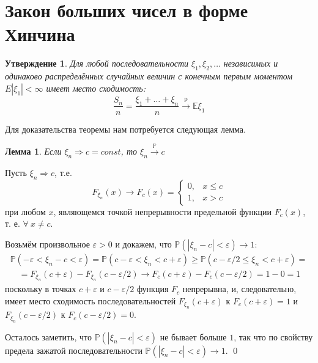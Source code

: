 \documentclass[oneside,final,14pt]{extreport}
\renewenvironment{proof}{{\bfseries Доказательство.}}{\qed}
\theoremstyle{plain}
\newtheorem*{thm*}{Утверждение}
\newtheorem*{lem}{Лемма}
\theoremstyle{definition}
\theoremstyle{named}
\begin{document}
\section{Закон больших чисел в форме Хинчина}
\begin{thm*}
    Для любой последовательности $\xi_{1}, \xi_{2}, \ldots$ независимых и одинаково распределённых случайных величин с конечным первым моментом $E\left|\xi_{1}\right|<\infty$ имеет место сходимость:
    \begin{equation*}
        \frac{S_{n}}{n} = \frac{\xi_{1}+\ldots+\xi_{n}}{n} \xrightarrow[]{\text{p}} \mathbb{E} \xi_{1}
    \end{equation*}
\end{thm*}
Для доказательства теоремы нам потребуется следующая лемма.
\begin{lem}
    Если $\xi_{n} \Rightarrow c=const$, то $\xi_{n} \stackrel{\mathbb{P}}{\longrightarrow} c$
\end{lem}
\begin{proof}
    Пусть $\xi_{n} \Rightarrow c$, т.е.
    \begin{equation*}
        F_{\xi_{n}}(x) \rightarrow F_{c}(x)=\left\{\begin{array}{ll}
        0, & x \leqslant c \\
        1, & x>c
        \end{array}\right.
    \end{equation*}
    при любом $x$, являющемся точкой непрерывности предельной функции $F_{c}(x)$, т. е. $\forall~ x \neq c$.
    
    Возьмём произвольное $\varepsilon>0$ и докажем, что $\mathbb{P}\left(\left|\xi_{n}-c\right|<\varepsilon\right) \rightarrow 1$:
    \begin{multline*}
        \mathbb{P}\left(-\varepsilon<\xi_{n}-c<\varepsilon\right)=\mathbb{P}\left(c-\varepsilon<\xi_{n}<c+\varepsilon\right) \geqslant \mathbb{P}\left(c-\varepsilon / 2 \leqslant \xi_{n}<c+\varepsilon\right)= \\
        \quad=F_{\xi_{n}}(c+\varepsilon)-F_{\xi_{n}}(c-\varepsilon / 2) \rightarrow F_{c}(c+\varepsilon)-F_{c}(c-\varepsilon / 2)=1-0=1
    \end{multline*}
    поскольку в точках $c+\varepsilon$ и $c-\varepsilon / 2$ функция $F_{c}$ непрерывна, и, следовательно, имеет место сходимость последовательностей $F_{\xi_{n}}(c+\varepsilon)$ к $F_{c}(c+\varepsilon)=1$ и $F_{\xi_{n}}(c-\varepsilon / 2)$ к $F_{c}(c-\varepsilon / 2)=0$.
    
    Осталось заметить, что $\mathbb{P}\left(\left|\xi_{n}-c\right|<\varepsilon\right)$ не бывает больше $1$, так что по свойству предела зажатой последовательности $\mathbb{P}\left(\left|\xi_{n}-c\right|<\varepsilon\right) \rightarrow 1$.
\end{proof}
\end{document}
